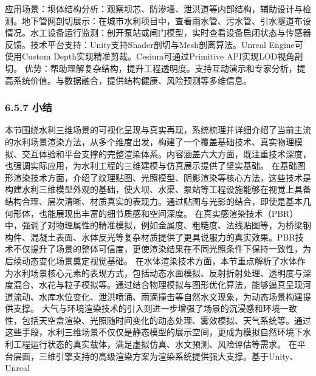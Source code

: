 应用场景：坝体结构分析：观察坝芯、防渗墙、泄洪道等内部结构，辅助设计与检测。地下管网剖切展示：在城市水利项目中，查看雨水管、污水管、引水隧道布设情况。水工设备运行监测：剖开泵站或闸门模型，实时查看设备启闭状态与传感器反馈。技术平台支持：Unity支持Shader剖切与Mesh剖离算法。Unreal Engine可使用Custom Depth实现精准剪裁。Cesium可通过Primitive API实现LOD视角剖切。 优势：帮助理解复杂结构，提升工程透明度。支持互动演示和专家分析，提高系统价值。与数据融合，提供结构健康、风险预测等多维信息。 \subsubsection{6.5.7 小结}\label{ux5c0fux7ed3} 本节围绕水利三维场景的可视化呈现与真实再现，系统梳理并详细介绍了当前主流的水利场景渲染方法，从多个维度出发，构建了一个覆盖基础技术、真实物理模拟、交互体验和平台支撑的完整渲染体系。内容涵盖六大方面，既注重技术深度，也强调实际应用，为水利工程的三维建模与仿真展示提供了坚实基础。 在基础图形渲染技术方面，介绍了纹理贴图、光照模型、阴影渲染等核心方法，这些技术是构建水利三维模型外观的基础，使大坝、水渠、泵站等工程设施能够在视觉上具备结构合理、层次清晰、材质真实的表现力。通过贴图与光影的结合，即使是基本几何形体，也能展现出丰富的细节质感和空间深度。 在真实感渲染技术（PBR）中，强调了对物理属性的精准模拟，例如金属度、粗糙度、法线贴图等，为桥梁钢构件、混凝土表面、水体反光等复杂材质提供了更具说服力的真实效果。PBR技术不仅提升了场景的整体可信度，更使渲染结果在不同光照条件下保持一致性，为后续动态变化场景奠定视觉基础。 在水体渲染技术方面，本节重点解析了水体作为水利场景核心元素的表现方式，包括动态水面模拟、反射折射处理、透明度与深度混合、水花与粒子模拟等。通过结合物理模拟与图形优化算法，能够逼真呈现河道流动、水库水位变化、泄洪喷涌、雨滴撞击等自然水文现象，为动态场景构建提供支撑。 大气与环境渲染技术的引入则进一步增强了场景的沉浸感和环境一致性，包括天空盒渲染、光照随时间变化的动态处理、雾效模拟、天气系统等。通过这些手段，水利三维场景不仅仅是静态模型的展示空间，更成为模拟自然环境下水利工程运行状态的真实载体，满足虚拟仿真、水文预测、风险评估等需求。 在平台层面，三维引擎支持的高级渲染方案为渲染系统提供强大支撑。基于Unity、Unreal 